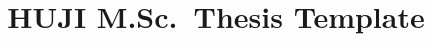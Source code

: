 \documentclass[12pt,a4paper,oneside,onecolumn]{book}
\title{HUJI M.Sc.~Thesis Template}
\begin{document}


%

\frontmatter

\renewcommand{\baselinestretch}{1.5}





\tableofcontents
\listoffigures
\listoftables

\mainmatter


% 




% 
% 

% 




\end{document}
